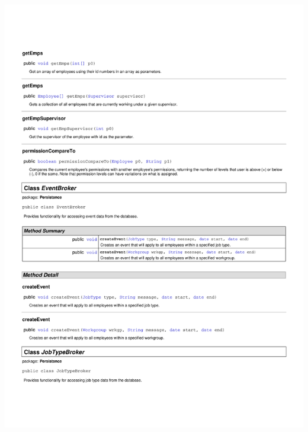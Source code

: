 \documentclass[letterpaper,12pt]{report}
\begin{document}
\includegraphics[scale=0.9,trim=20mm 30mm 25mm 25mm]{externals/PersistanceDataDictionary2.pdf}
\newpage
\end{document}
